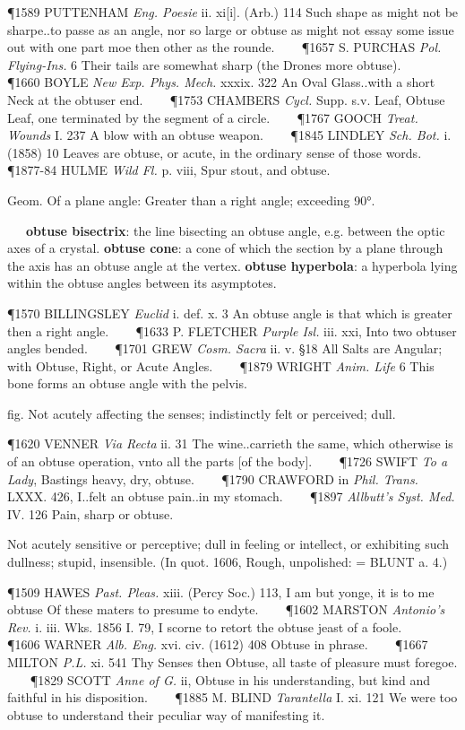 \begin{description}[wide, labelwidth=!, labelindent=0pt]
\begin{myenumerate}
\P 1589 PUTTENHAM  \textit{Eng. Poesie} ii. xi[i]. (Arb.) 114 Such shape as might not be sharpe..to passe as an angle, nor so large or obtuse as might not essay some issue out with one part moe then other as the rounde.    
\P 1657 S. PURCHAS  \textit{Pol. Flying-Ins.} 6 Their tails are somewhat sharp (the Drones more obtuse).    
\P 1660 BOYLE  \textit{New Exp. Phys. Mech.} xxxix. 322 An Oval Glass..with a short Neck at the obtuser end.    
\P 1753 CHAMBERS  \textit{Cycl.} Supp. s.v. Leaf, Obtuse Leaf, one terminated by the segment of a circle.    
\P 1767 GOOCH  \textit{Treat. Wounds} I. 237 A blow with an obtuse weapon.    
\P 1845 LINDLEY  \textit{Sch. Bot.} i. (1858) 10 Leaves are obtuse, or acute, in the ordinary sense of those words.    
\P 1877-84 HULME  \textit{Wild Fl.} p. viii, Spur stout, and obtuse.

 Geom. Of a plane angle: Greater than a right angle; exceeding 90°.

   \textbf{obtuse bisectrix}: the line bisecting an obtuse angle, e.g. between the optic axes of a crystal. 
\textbf{obtuse cone}: a cone of which the section by a plane through the axis has an obtuse angle at the vertex. \textbf{obtuse hyperbola}: a hyperbola lying within the obtuse angles between its asymptotes.

\P 1570 BILLINGSLEY  \textit{Euclid} i. def. x. 3 An obtuse angle is that which is greater then a right angle.    
\P 1633 P. FLETCHER  \textit{Purple Isl.} iii. xxi, Into two obtuser angles bended.    
\P 1701 GREW  \textit{Cosm. Sacra} ii. v. §18 All Salts are Angular; with Obtuse, Right, or Acute Angles.    
\P 1879 WRIGHT  \textit{Anim. Life} 6 This bone forms an obtuse angle with the pelvis.

 fig. Not acutely affecting the senses; indistinctly felt or perceived; dull.

\P 1620 VENNER  \textit{Via Recta} ii. 31 The wine..carrieth the same, which otherwise is of an obtuse operation, vnto all the parts [of the body].    
\P 1726 SWIFT  \textit{To a Lady}, Bastings heavy, dry, obtuse.    
\P 1790 CRAWFORD in  \textit{Phil. Trans.} LXXX. 426, I..felt an obtuse pain..in my stomach.    
\P 1897  \textit{Allbutt's Syst. Med.} IV. 126 Pain, sharp or obtuse.

 Not acutely sensitive or perceptive; dull in feeling or intellect, or exhibiting such dullness; stupid, insensible. (In quot. 1606, Rough, unpolished: = BLUNT a. 4.)

\P 1509 HAWES  \textit{Past. Pleas.} xiii. (Percy Soc.) 113, I am but yonge, it is to me obtuse Of these maters to presume to endyte.    
\P 1602 MARSTON  \textit{Antonio's Rev.} i. iii. Wks. 1856 I. 79,  I scorne to retort the obtuse jeast of a foole.    
\P 1606 WARNER  \textit{Alb. Eng.} xvi. civ. (1612) 408 Obtuse in phrase.    
\P 1667 MILTON  \textit{P.L.} xi. 541 Thy Senses then Obtuse, all taste of pleasure must foregoe.    
\P 1829 SCOTT  \textit{Anne of G.} ii, Obtuse in his understanding, but kind and faithful in his disposition.    
\P 1885 M. BLIND  \textit{Tarantella} I. xi. 121 We were too obtuse to understand their peculiar way of manifesting it.


\end{myenumerate}
\end{description}
